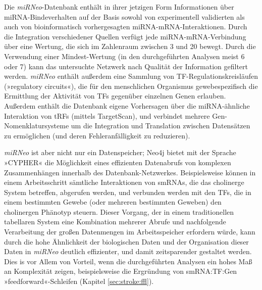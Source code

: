 Die \emph{miRNeo}-Datenbank enthält in ihrer jetzigen Form Informationen über miRNA-Bindeverhalten auf der Basis sowohl von experimentell validierten als auch von bioinformatisch vorhergesagten miRNA-mRNA-Interaktionen. Durch die Integration verschiedener Quellen verfügt jede miRNA-mRNA-Verbindung über eine Wertung, die sich im Zahlenraum zwischen 3 und 20 bewegt. Durch die Verwendung einer Mindest-Wertung (in den durchgeführten Analysen meist 6 oder 7) kann das untersuchte Netzwerk nach Qualität der Information gefiltert werden. \emph{miRNeo} enthält außerdem eine Sammlung von TF-Regulationskreisläufen (»regulatory circuits«), die für den menschlichen Organismus gewebespezifisch die Ermittlung der Aktivität von TFs gegenüber einzelnen Genen erlauben.\cite{Marbach2016} Außerdem enthält die Datenbank eigene Vorhersagen über die miRNA-ähnliche Interaktion von tRFs (mittels TargetScan), und verbindet mehrere Gen-Nomenklatursysteme um die Integration und Translation zwischen Datensätzen zu ermöglichen (und deren Fehleranfälligkeit zu reduzieren).

\emph{miRNeo} ist aber nicht nur ein Datenspeicher; Neo4j bietet mit der Sprache »CYPHER« die Möglichkeit eines effizienten Datenabrufs von komplexen Zusammenhängen innerhalb des Datenbank-Netzwerkes. Beispielsweise können in einem Arbeitsschritt sämtliche Interaktionen von smRNAs, die das cholinerge System betreffen, abgerufen werden, und verbunden werden mit den TFs, die in einem bestimmten Gewebe (oder mehreren bestimmten Geweben) den cholinergen Phänotyp steuern. Dieser Vorgang, der in einem traditionellen tabellaren System eine Kombination mehrerer Abrufe und nachfolgende Verarbeitung der großen Datenmengen im Arbeitsspeicher erfordern würde, kann durch die hohe Ähnlichkeit der biologischen Daten und der Organisation dieser Daten in \emph{miRNeo} deutlich effizienter, und damit zeitsparender gestaltet werden. Dies is vor Allem von Vorteil, wenn die durchgeführten Analysen ein hohes Maß an Komplexität zeigen, beispielsweise die Ergründung von smRNA:TF:Gen »feedforward«-Schleifen (Kapitel \ref{sec:stroke:ffl}).

